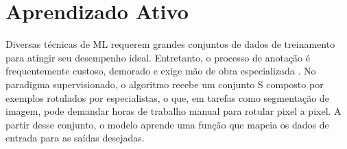 





\section{Aprendizado Ativo}
\label{sec_al_fund}

Diversas técnicas de \ac{ML} requerem grandes conjuntos de dados de treinamento para atingir seu desempenho ideal. Entretanto, o processo de anotação é frequentemente custoso, demorado e exige mão de obra especializada \cite{konyushkova2017learning}. 
No paradigma supervisionado, o algoritmo recebe um conjunto S composto por exemplos rotulados por especialistas, o que, em tarefas como segmentação de imagem, pode demandar horas de trabalho manual para rotular pixel a pixel. A partir desse conjunto, o modelo aprende uma função que mapeia os dados de entrada para as saídas desejadas.

